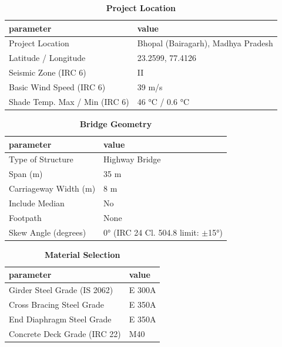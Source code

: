 \documentclass[12pt,a4paper]{report}
\numberwithin{table}{chapter}
\numberwithin{figure}{chapter}
\begin{document}
\begin{table}[H]
\caption{\textbf{Project Location}}
\label{subsec:project-location}
\begin{tabular}{|L{5.5cm}|L{8.5cm}|}
\hline
\textbf{parameter} & \textbf{value} \\
\hline
\textnormal{Project Location} & Bhopal (Bairagarh), Madhya Pradesh \\
\hline
\textnormal{Latitude / Longitude} & 23.2599, 77.4126 \\
\hline
\textnormal{Seismic Zone (IRC 6)} & II \\
\hline
\textnormal{Basic Wind Speed (IRC 6)} & 39 m/s \\
\hline
\textnormal{Shade Temp. Max / Min (IRC 6)} & 46 °C / 0.6 °C \\
\hline
\end{tabular}
\vspace{0.4cm}
\end{table}

\begin{table}[H]
\caption{\textbf{Bridge Geometry}}
\label{subsec:bridge-geometry}
\begin{tabular}{|L{5.5cm}|L{8.5cm}|}
\hline
\textbf{parameter} & \textbf{value} \\
\hline
\textnormal{Type of Structure} & Highway Bridge \\
\hline
\textnormal{Span (m)} & 35 m \\
\hline
\textnormal{Carriageway Width (m)} & 8 m \\
\hline
\textnormal{Include Median} & No \\
\hline
\textnormal{Footpath} & None \\
\hline
\textnormal{Skew Angle (degrees)} & 0° (IRC 24 Cl. 504.8 limit: $\pm$15°) \\
\hline
\end{tabular}
\end{table}
\vspace{0.4cm}

\begin{table}[H]
\caption{\textbf{Material Selection}}
\label{subsec:material}
\begin{tabular}{|L{5.5cm}|L{8.5cm}|}
\hline
\textbf{parameter} & \textbf{value} \\
\hline
\textnormal{Girder Steel Grade (IS 2062)} & E 300A \\
\hline
\textnormal{Cross Bracing Steel Grade} & E 350A \\
\hline
\textnormal{End Diaphragm Steel Grade} & E 350A \\
\hline
\textnormal{Concrete Deck Grade (IRC 22)} & M40 \\
\hline
\end{tabular}
\end{table}
\vspace{0.4cm}
\end{document}
